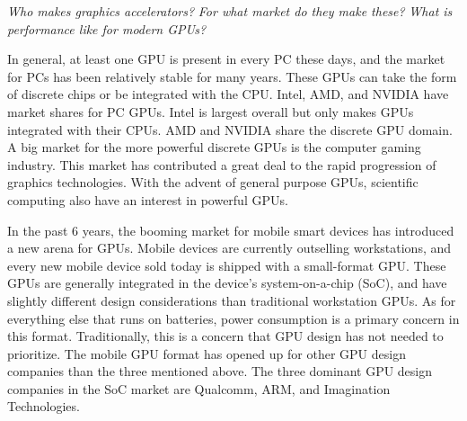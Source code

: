 \documentclass[../main/report.tex]{subfiles}
\begin{document}
\textit{Who makes graphics accelerators?}
\textit{For what market do they make these?}
\textit{What is performance like for modern GPUs?}



In general, at least one GPU is present in every PC these days, and the market for PCs has been relatively stable for many years.
These GPUs can take the form of discrete chips or be integrated with the CPU.
Intel, AMD, and NVIDIA have market shares for PC GPUs.
Intel is largest overall but only makes GPUs integrated with their CPUs.
AMD and NVIDIA share the discrete GPU domain.
A big market for the more powerful discrete GPUs is the computer gaming industry.
This market has contributed a great deal to the rapid progression of graphics technologies.
With the advent of general purpose GPUs, scientific computing also have an interest in powerful GPUs.

In the past 6 years, the booming market for mobile smart devices has introduced a new arena for GPUs.
Mobile devices are currently outselling workstations, and every new mobile device sold today is shipped with a small-format GPU.
These GPUs are generally integrated in the device's system-on-a-chip (SoC), and have slightly different design considerations than traditional workstation GPUs.
As for everything else that runs on batteries, power consumption is a primary concern in this format.
Traditionally, this is a concern that GPU design has not needed to prioritize.
The mobile GPU format has opened up for other GPU design companies than the three mentioned above.
The three dominant GPU design companies in the SoC market are Qualcomm, ARM, and Imagination Technologies.

\end{document}
